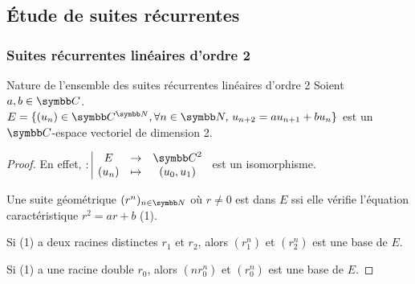 \subsection{Étude de suites récurrentes}

\subsubsection{Suites récurrentes linéaires d'ordre 2}
\begin{proposition}{Nature de l'ensemble des suites récurrentes linéaires d'ordre 2}{}
    Soient $a, b \in \C$.  
    $E = \{(u_n) \in \C^{\N}, \forall n \in \N, \, u_{n + 2} = a u_{n + 1} + bu_n\}$ est 
    un $\C$-espace vectoriel de dimension 2. 
\end{proposition}
\newpage

\begin{proof}
    En effet, $\fonction{}{E}{\C^2}{(u_n)}{(u_0, u_1)}$ est un isomorphisme. 
    
    Une suite géométrique $(r^n)_{n \in \N}$ où $r \neq 0$ est dans $E$ ssi elle vérifie
    l'équation caractéristique $r^2 = ar + b$ (1).

    Si (1) a deux racines distinctes $r_1$ et $r_2$, alors $(r_1^n)$ et $(r_2^n)$ est une base de $E$.

    Si (1) a une racine double $r_0$, alors $(nr_0^n)$ et $(r_0^n)$ est une base de $E$.    
\end{proof}

